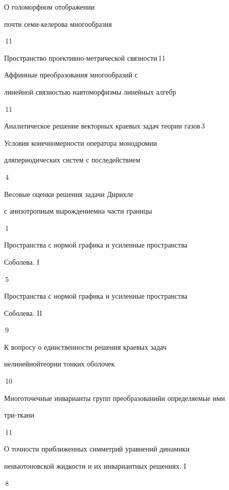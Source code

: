 

{О голоморфном отображении


почти семи-келерова многообразия}{\No\,11}




{Пространство проективно-метрической связности}{\No\,11}




{Аффинные преобразования многообразий с  


линейной связностью и\newline автоморфизмы линейных алгебр}{\No\,11}




{Аналитическое решение векторных краевых задач теории газов}{\No\,3}




{Условия конечномерности оператора монодромии


для\newline периодических систем с последействием}{\No\,4}




{Весовые оценки решения задачи Дирихле


с анизотропным вырождением\newline на части границы}{\No\,1}




{Пространства с нормой графика и усиленные пространства


Соболева. I}{\No\,5}




{Пространства с нормой графика и усиленные пространства


Соболева. II}{\No\,9}




{К вопросу о единственности решения краевых задач  


нелинейной\newline теории тонких оболочек}{\No\,10}




{Многоточечные инварианты групп преобразований\newline и определяемые ими


три-ткани}{\No\,11}




{О точности приближенных симметрий уравнений динамики \newline


неньютоновской жидкости и их инвариантных решениях. I}{\No\,8}


